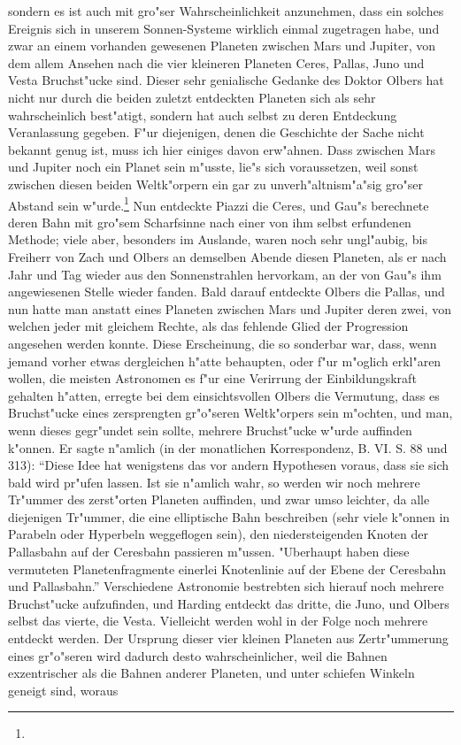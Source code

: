 \documentclass[a4paper, 11pt, oneside, polutonikogreek, german]{article}
\begin{document}
sondern es ist auch mit gro"ser Wahrscheinlichkeit anzunehmen, dass ein solches Ereignis sich in unserem Sonnen-Systeme wirklich einmal zugetragen habe, und zwar an einem vorhanden gewesenen Planeten zwischen Mars und Jupiter, von dem allem Ansehen nach die vier kleineren Planeten Ceres, Pallas, Juno und Vesta Bruchst"ucke sind. Dieser sehr genialische Gedanke des Doktor Olbers hat nicht nur durch die beiden zuletzt entdeckten Planeten sich als sehr wahrscheinlich best"atigt, sondern hat auch selbst zu deren Entdeckung Veranlassung gegeben. F"ur diejenigen, denen die Geschichte der Sache nicht bekannt genug ist, muss ich hier einiges davon erw"ahnen. Dass zwischen Mars und Jupiter noch ein Planet sein m"usste, lie"s sich voraussetzen, weil sonst zwischen diesen beiden Weltk"orpern ein gar zu unverh"altnism"a"sig gro"ser Abstand sein w"urde.\footnote{} Nun entdeckte Piazzi die Ceres, und Gau"s berechnete deren Bahn mit gro"sem Scharfsinne nach einer von ihm selbst erfundenen Methode; viele aber, besonders im Auslande, waren noch sehr ungl"aubig, bis Freiherr von Zach und Olbers an demselben Abende diesen Planeten, als er nach Jahr und Tag wieder aus den Sonnenstrahlen hervorkam, an der von Gau"s ihm angewiesenen Stelle wieder fanden. Bald darauf entdeckte Olbers die Pallas, und nun hatte man anstatt eines Planeten zwischen Mars und Jupiter deren zwei, von welchen jeder mit gleichem Rechte, als das fehlende Glied der Progression angesehen werden konnte. Diese Erscheinung, die so sonderbar war, dass, wenn jemand vorher etwas dergleichen h"atte behaupten, oder f"ur m"oglich erkl"aren wollen, die meisten Astronomen es f"ur eine Verirrung der Einbildungskraft gehalten h"atten, erregte bei dem einsichtsvollen Olbers die Vermutung, dass es Bruchst"ucke eines zersprengten gr"o"seren Weltk"orpers sein m"ochten, und man, wenn dieses gegr"undet sein sollte, mehrere Bruchst"ucke w"urde auffinden k"onnen. Er sagte n"amlich (in der monatlichen Korrespondenz, B. VI. S. 88 und 313): "`Diese Idee hat wenigstens das vor andern Hypothesen voraus, dass sie sich bald wird pr"ufen lassen. Ist sie n"amlich wahr, so werden wir noch mehrere Tr"ummer des zerst"orten Planeten auffinden, und zwar umso leichter, da alle diejenigen Tr"ummer, die eine elliptische Bahn beschreiben (sehr viele k"onnen in Parabeln oder Hyperbeln weggeflogen sein), den niedersteigenden Knoten der Pallasbahn auf der Ceresbahn passieren m"ussen. "Uberhaupt haben diese vermuteten Planetenfragmente einerlei Knotenlinie auf der Ebene der Ceresbahn und Pallasbahn."' Verschiedene Astronomie bestrebten sich hierauf noch mehrere Bruchst"ucke aufzufinden, und Harding entdeckt das dritte, die Juno, und Olbers selbst das vierte, die Vesta. Vielleicht werden wohl in der Folge noch mehrere entdeckt werden. Der Ursprung dieser vier kleinen Planeten aus Zertr"ummerung eines gr"o"seren wird dadurch desto wahrscheinlicher, weil die Bahnen exzentrischer als die Bahnen anderer Planeten, und unter schiefen Winkeln geneigt sind, woraus 
\end{document}
